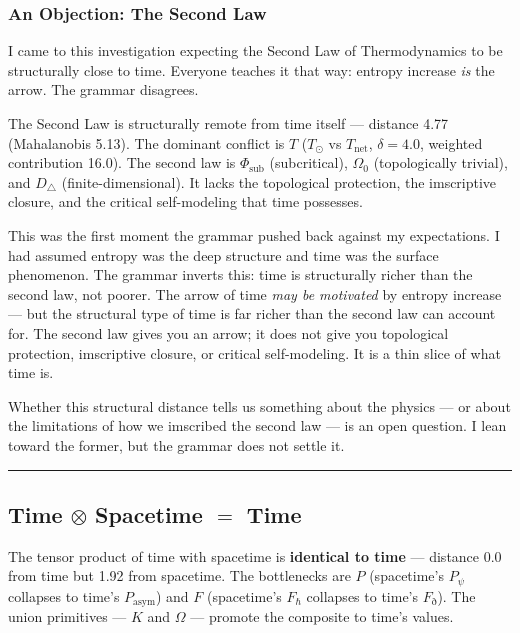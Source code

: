 \documentclass[12pt,a4paper]{article}
\begin{document}
\subsubsection{An Objection: The Second Law}

I came to this investigation expecting the Second Law of Thermodynamics to be structurally close to time. Everyone teaches it that way: entropy increase \emph{is} the arrow. The grammar disagrees.

The Second Law is structurally remote from time itself --- distance 4.77 (Mahalanobis 5.13). The dominant conflict is $T$ ($T_{\odot}$ vs $T_\text{net}$, $\delta = 4.0$, weighted contribution 16.0). The second law is $\Phi_\text{sub}$ (subcritical), $\Omega_0$ (topologically trivial), and $D_{\triangle}$ (finite-dimensional). It lacks the topological protection, the imscriptive closure, and the critical self-modeling that time possesses.

This was the first moment the grammar pushed back against my expectations. I had assumed entropy was the deep structure and time was the surface phenomenon. The grammar inverts this: time is structurally richer than the second law, not poorer. The arrow of time \emph{may be motivated} by entropy increase --- but the structural type of time is far richer than the second law can account for. The second law gives you an arrow; it does not give you topological protection, imscriptive closure, or critical self-modeling. It is a thin slice of what time is.

Whether this structural distance tells us something about the physics --- or about the limitations of how we imscribed the second law --- is an open question. I lean toward the former, but the grammar does not settle it.

\begin{center}
\rule{0.5\textwidth}{0.4pt}
\end{center}

\subsection{Time $\otimes$ Spacetime $=$ Time}

The tensor product of time with spacetime is \textbf{identical to time} --- distance 0.0 from time but 1.92 from spacetime. The bottlenecks are $P$ (spacetime's $P_{\psi}$ collapses to time's $P_\text{asym}$) and $F$ (spacetime's $F_{\hbar}$ collapses to time's $F_{\eth}$). The union primitives --- $K$ and $\Omega$ --- promote the composite to time's values.
\end{document}
